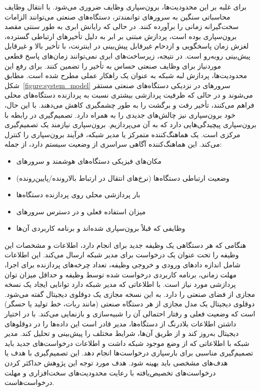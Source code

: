 برای غلبه بر این محدودیت‌ها، برون‌سپاری وظایف ضروری می‌شود. با انتقال وظایف محاسباتی سنگین به سرورهای توانمندتر، دستگاه‌های صنعتی می‌توانند الزامات سخت‌گیرانه زمانی را برآورده کنند. در حالی که رایانش ابری به طور سنتی مقصد برون‌سپاری بوده است، پردازش مبتنی بر ابر به دلیل تأخیرهای ارتباطی گسترده، لغزش زمان پاسخگویی و ازدحام غیرقابل پیش‌بینی در اینترنت، با تأخیر بالا و غیرقابل پیش‌بینی روبه‌رو است. در نتیجه، زیرساخت‌های ابری نمی‌توانند زمان‌های پاسخ قطعی موردنیاز برای وظایف صنعتی حساس به تأخیر را تضمین کنند. برای رفع این محدودیت‌ها، پردازش لبه شبکه به عنوان یک راهکار عملی مطرح شده است. مطابق شکل~\ref{figure:system_model} سرورهای  در نزدیکی دستگاه‌های صنعتی مستقر می‌شوند و در حالی که ظرفیت پردازشی بیشتری نسبت به پردازنده دستگاه‌های محلی فراهم می‌کنند، تأخیر رفت و برگشت را به طور چشمگیری کاهش می‌دهند. با این حال، خود برون‌سپاری نیز چالش‌های جدیدی را به همراه دارد. تصمیم‌گیری در رابطه با برون‌سپاری پیچیدگی‌هایی دارد که به آن می‌پردازیم. برون‌سپاری نیازمند یک تصمیم‌گیری مرکزی‌ است. یک هماهنگ‌کننده متمرکز یا مدیر شبکه، فرآیند برون‌سپاری را کنترل می‌کند. این هماهنگ‌کننده آگاهی سراسری از وضعیت سیستم دارد، از جمله:

\begin{itemize}
\item
مکان‌های فیزیکی دستگاه‌های هوشمند و سرورهای 
\item
وضعیت ارتباطی دستگاه‌ها (نرخ‌های انتقال در ارتباط بالارونده/پایین‌رونده)
\item
بار پردازشی محلی روی پردازنده دستگاه‌ها
\item
میزان استفاده فعلی و در دسترس سرورهای 
\item
وظایفی که قبلاً برون‌سپاری شده‌اند و برنامه کاربردی آن‌ها
\end{itemize}

هنگامی که هر دستگاهی یک وظیفه جدید برای انجام دارد، اطلاعات و مشخصات این وظیفه را تحت عنوان یک درخواست برای مدیر شبکه ارسال می‌کند. این اطلاعات شامل اندازه داد‌های ورودی و خروجی وظیفه، تعداد چرخه‌های پردازنده برای اجرا،‌ مهلت زمانی، برنامه کاربردی درخواست شده توسط وظیفه و حداقل میزان توان پردازشی مورد نیاز است. با اطلاعاتی که مدیر شبکه دارد توانایی ایجاد یک نسخه مجازی از فضای صنعتی را دارد. به این نسخه مجازی یک دوقلوی دیجیتال گفته می‌شود. دوقلوی دیجیتال یک مدل مجازی از هر دستگاه صنعتی (مانند ربات، خط تولید یا حسگر) است که وضعیت فعلی و رفتار احتمالی آن را شبیه‌سازی و بازنمایی می‌کند. با در اختیار داشتن اطلاعات بلادرنگ از دستگاه‌ها، مدیر قادر است این داده‌ها را در دوقلوهای دیجیتال به‌روز کند و از طریق آن‌ها، شرایط مختلف را پیش‌بینی و تحلیل کند. مدیر شبکه با اطلاعاتی که از وضع موجود شبکه داشت و اطلاعات درخواست‌های جدید باید تصمیم‌گیری مناسبی برای بارسپاری درخواست‌ها انجام دهد. این تصمیم‌گیری با هدف یا هدف‌های مشخصی باید بهینه شود. هدف مورد توجه این پژوهش حداکثر کردن درخواست‌های تخصیص‌یافته با رعایت محدودیت‌های سخت‌افزاری و مهلت درخواست‌هاست.

